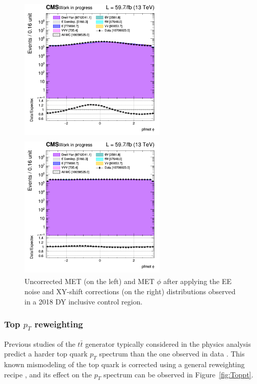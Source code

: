 \documentclass[a4paper, 10pt, openright]{report}
\begin{document}
\begin{figure}[htbp]
\centering
\begin{minipage}[b]{.49\textwidth}
\includegraphics[width=7cm, height=7cm]{figs/2018/log_cratio_inclusiveCR_ll_pfmet_phi.png}
\end{minipage}\hfill
\begin{minipage}[b]{.49\textwidth}
\includegraphics[width=7cm, height=7cm]{figs/2018/log_cratio_inclusiveCR_ll_METcorrected_phi.png}
\end{minipage} \hfill
\caption{Uncorrected MET (on the left) and MET $\phi$ after applying the EE noise and XY-shift corrections (on the right) distributions observed in a 2018 \ac{DY} inclusive control region.}
\label{fig:metCorrEffect}
\end{figure}

\subsubsection{Top $p_T$ reweighting} \label{subsection:toppt}

Previous studies of the $t \bar t$ generator typically considered in the physics analysis predict a harder top quark $p_T$ spectrum than the one observed in data \cite{topPt}. This known mismodeling of the top quark is corrected using a general reweighting recipe \cite{TopPtRecipe}, and its effect on the $p_T$ spectrum can be observed in Figure~\ref{fig:Toppt}.
\end{document}
